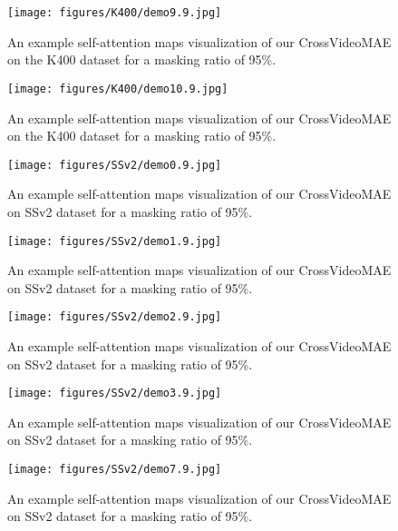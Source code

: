 \begin{figure}[h!]
\centering
\texttt{[image: figures/K400/demo9.9.jpg]}
\caption{An example self-attention maps visualization of our CrossVideoMAE on the K400 dataset for a masking ratio of 95\%.}
\label{fig:figure10}
\end{figure}

\begin{figure}[h!]
\centering
\texttt{[image: figures/K400/demo10.9.jpg]}
\caption{An example self-attention maps visualization of our CrossVideoMAE on the K400 dataset for a masking ratio of 95\%.}
\label{fig:figure11}
\end{figure}

\begin{figure}[h!]
\centering
\texttt{[image: figures/SSv2/demo0.9.jpg]}
\caption{An example self-attention maps visualization of our CrossVideoMAE on SSv2 dataset for a masking ratio of 95\%.}
\label{fig:figure12}
\end{figure}

\begin{figure}[h!]
\centering
\texttt{[image: figures/SSv2/demo1.9.jpg]}
\caption{An example self-attention maps visualization of our CrossVideoMAE on SSv2 dataset for a masking ratio of 95\%.}
\label{fig:figure13}
\end{figure}

\begin{figure}[h!]
\centering
\texttt{[image: figures/SSv2/demo2.9.jpg]}
\caption{An example self-attention maps visualization of our CrossVideoMAE on SSv2 dataset for a masking ratio of 95\%.}
\label{fig:figure14}
\end{figure}

\begin{figure}[h!]
\centering
\texttt{[image: figures/SSv2/demo3.9.jpg]}
\caption{An example self-attention maps visualization of our CrossVideoMAE on SSv2 dataset for a masking ratio of 95\%.}
\label{fig:figure15}
\end{figure}

\begin{figure}[h!]
\centering
\texttt{[image: figures/SSv2/demo7.9.jpg]}
\caption{An example self-attention maps visualization of our CrossVideoMAE on SSv2 dataset for a masking ratio of 95\%.}
\label{fig:figure16}
\end{figure}

